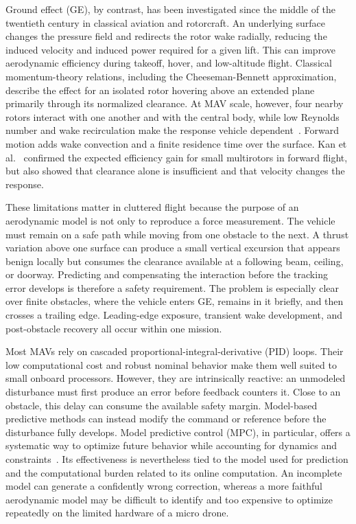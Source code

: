 \documentclass[journal]{IEEEtran}
\begin{document}
Ground effect (GE), by contrast, has been investigated since the middle of the twentieth century in classical aviation and rotorcraft. An underlying surface changes the pressure field and redirects the rotor wake radially, reducing the induced velocity and induced power required for a given lift. This can improve aerodynamic efficiency during takeoff, hover, and low-altitude flight. Classical momentum-theory relations, including the Cheeseman-Bennett approximation, describe the effect for an isolated rotor hovering above an extended plane primarily through its normalized clearance. At MAV scale, however, four nearby rotors interact with one another and with the central body, while low Reynolds number and wake recirculation make the response vehicle dependent~\cite{Matus2020,Carter2021}. Forward motion adds wake convection and a finite residence time over the surface. Kan et al.~\cite{Kan2019} confirmed the expected efficiency gain for small multirotors in forward flight, but also showed that clearance alone is insufficient and that velocity changes the response.

These limitations matter in cluttered flight because the purpose of an aerodynamic model is not only to reproduce a force measurement. The vehicle must remain on a safe path while moving from one obstacle to the next. A thrust variation above one surface can produce a small vertical excursion that appears benign locally but consumes the clearance available at a following beam, ceiling, or doorway. Predicting and compensating the interaction before the tracking error develops is therefore a safety requirement. The problem is especially clear over finite obstacles, where the vehicle enters GE, remains in it briefly, and then crosses a trailing edge. Leading-edge exposure, transient wake development, and post-obstacle recovery all occur within one mission.

Most MAVs rely on cascaded proportional-integral-derivative (PID) loops. Their low computational cost and robust nominal behavior make them well suited to small onboard processors. However, they are intrinsically reactive: an unmodeled disturbance must first produce an error before feedback counters it. Close to an obstacle, this delay can consume the available safety margin. Model-based predictive methods can instead modify the command or reference before the disturbance fully develops. Model predictive control (MPC), in particular, offers a systematic way to optimize future behavior while accounting for dynamics and constraints~\cite{MPCReview2021}. Its effectiveness is nevertheless tied to the model used for prediction and the computational burden related to its online computation. An incomplete model can generate a confidently wrong correction, whereas a more faithful aerodynamic model may be difficult to identify and too expensive to optimize repeatedly on the limited hardware of a micro drone.
\end{document}
